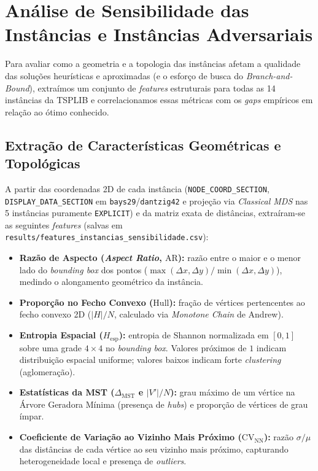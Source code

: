 \section{Análise de Sensibilidade das Instâncias e Instâncias Adversariais}
\label{sec:sensibilidade}

Para avaliar como a geometria e a topologia das instâncias afetam a qualidade das soluções heurísticas e aproximadas (e o esforço de busca do \textit{Branch-and-Bound}), extraímos um conjunto de \textit{features} estruturais para todas as 14 instâncias da TSPLIB e correlacionamos essas métricas com os \textit{gaps} empíricos em relação ao ótimo conhecido.

\subsection{Extração de Características Geométricas e Topológicas}

A partir das coordenadas 2D de cada instância (\texttt{NODE\_COORD\_SECTION}, \texttt{DISPLAY\_DATA\_SECTION} em \texttt{bays29}/\texttt{dantzig42} e projeção via \textit{Classical MDS} nas 5 instâncias puramente \texttt{EXPLICIT}) e da matriz exata de distâncias, extraíram-se as seguintes \textit{features} (salvas em \texttt{results/features\_instancias\_sensibilidade.csv}):

\begin{itemize}
    \item \textbf{Razão de Aspecto (\textit{Aspect Ratio}, $\mathrm{AR}$):} razão entre o maior e o menor lado do \textit{bounding box} dos pontos ($\max(\Delta x, \Delta y) / \min(\Delta x, \Delta y)$), medindo o alongamento geométrico da instância.
    \item \textbf{Proporção no Fecho Convexo ($\mathrm{Hull}$):} fração de vértices pertencentes ao fecho convexo 2D ($|H|/N$, calculado via \textit{Monotone Chain} de Andrew).
    \item \textbf{Entropia Espacial ($H_{\text{esp}}$):} entropia de Shannon normalizada em $[0,1]$ sobre uma grade $4 \times 4$ no \textit{bounding box}. Valores próximos de $1$ indicam distribuição espacial uniforme; valores baixos indicam forte \textit{clustering} (aglomeração).
    \item \textbf{Estatísticas da MST ($\Delta_{\text{MST}}$ e $|V'|/N$):} grau máximo de um vértice na Árvore Geradora Mínima (presença de \textit{hubs}) e proporção de vértices de grau ímpar.
    \item \textbf{Coeficiente de Variação ao Vizinho Mais Próximo ($\mathrm{CV}_{\text{NN}}$):} razão $\sigma/\mu$ das distâncias de cada vértice ao seu vizinho mais próximo, capturando heterogeneidade local e presença de \textit{outliers}.
\end{itemize}

